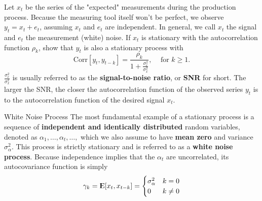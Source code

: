 \documentclass[UTF8,a4paper,14pt]{ctexart}
\newcommand{\E}{{\rm I\kern-.3em E}}
\newcommand{\Corr}{\mathrm{Corr}}
\theoremstyle{definition}
\theoremstyle{remark}
\begin{document}
\pagebreak
\begin{Problem}{}
    Let $x_t$ be the series of the "expected" measurements during the production process. Because the measuring tool itself won't be perfect, we observe \(y_t = x_t + e_t\), assuming $x_t$ and $e_t$ are independent. In general, we call $x_t$ the signal and $e_t$ the measurement (white) noise. If $x_t$ is stationary with the autocorrelation function $\rho_k$, show that $y_t$ is also a stationary process with 
\[\Corr[y_t, y_{t-k}] =\frac{\rho_k}{1 + \frac{\sigma_e^2}{\sigma_x^2}},\,\quad \text{for } k \geq 1.\]
\(\frac{\sigma_e^2}{\sigma_x^2}\) is usually referred to as the \textbf{signal-to-noise ratio}, or \textbf{SNR} for short.
The larger the SNR, the closer the autocorrelation function of the observed series $y_t$ is to the autocorrelation function of the desired signal $x_t$.
    
\end{Problem}
\begin{mybox}{White Noise Process}
    The most fundamental example of a stationary process is a sequence of \textbf{independent and identically distributed} random variables, denoted as $\alpha_1, \ldots , \alpha_t, \ldots,$ which we also assume to have \textbf{mean zero} and variance $\sigma_\alpha^2$. This process is strictly stationary and is referred to as a \textbf{white noise process}. Because independence implies that the $\alpha_t$ are uncorrelated, its autocovariance function is simply
    \[\gamma_k = \E[x_t,x_{t-k}] = \begin{cases}
        \sigma_\alpha^2 & k = 0\\
        0               & k \neq0
    \end{cases}\]       
\end{mybox}
\end{document}
